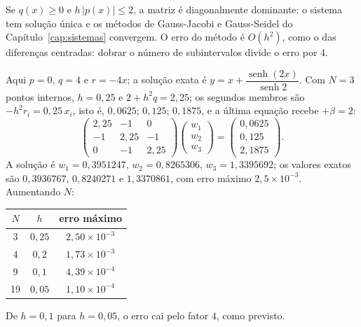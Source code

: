 \begin{observacao}
Se $q(x)\ge0$ e $h\,|p(x)|\le2$, a matriz é diagonalmente dominante: o sistema tem solução
única e os métodos de Gauss-Jacobi e Gauss-Seidel do Capítulo~\ref{cap:sistemas} convergem.
O erro do método é $O(h^2)$, como o das diferenças centradas: dobrar o número de
subintervalos divide o erro por 4.
\end{observacao}

\begin{exemplo}[: $y''=4(y-x)$, $y(0)=0$, $y(1)=2$]
Aqui $p=0$, $q=4$ e $r=-4x$; a solução exata é $y=x+\dfrac{\operatorname{senh}(2x)}{\operatorname{senh}2}$.
Com $N=3$ pontos internos, $h=0{,}25$ e $2+h^2q=2{,}25$; os segundos membros são
$-h^2r_i=0{,}25\,x_i$, isto é, $0{,}0625$; $0{,}125$; $0{,}1875$, e a última equação recebe
$+\beta=2$:
\[
\begin{pmatrix}2{,}25&-1&0\\-1&2{,}25&-1\\0&-1&2{,}25\end{pmatrix}
\begin{pmatrix}w_1\\w_2\\w_3\end{pmatrix}=
\begin{pmatrix}0{,}0625\\0{,}125\\2{,}1875\end{pmatrix}.
\]
A solução é $w_1=0{,}3951247$, $w_2=0{,}8265306$, $w_3=1{,}3395692$; os valores exatos são
$0{,}3936767$, $0{,}8240271$ e $1{,}3370861$, com erro máximo $2{,}5\times10^{-3}$. Aumentando $N$:
\begin{center}
\renewcommand{\arraystretch}{1.25}
\begin{tabular}{c|c|c}
$N$ & $h$ & erro máximo\\ \hline
3 & $0{,}25$ & $2{,}50\times10^{-3}$\\
4 & $0{,}2$ & $1{,}73\times10^{-3}$\\
9 & $0{,}1$ & $4{,}39\times10^{-4}$\\
19 & $0{,}05$ & $1{,}10\times10^{-4}$
\end{tabular}
\end{center}
De $h=0{,}1$ para $h=0{,}05$, o erro cai pelo fator $4$, como previsto.
\end{exemplo}

